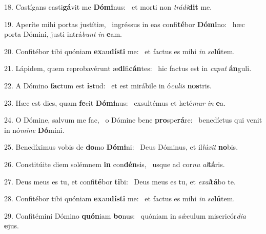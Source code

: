 18. Castígans casti\textbf{gá}vit me \textbf{Dó}\textbf{mi}nus: \ast\  et morti non \textit{trá}\textit{di}\textbf{dit} me.\

19. Aperíte mihi portas justítiæ, \dag\  ingréssus in eas confi\textbf{té}bor \textbf{Dó}\textbf{mi}no: \ast\  hæc porta Dómini, justi intrá\textit{bunt} \textit{in} \textbf{e}am.\

20. Confitébor tibi quóniam \textbf{ex}au\textbf{dís}\textbf{ti} me: \ast\  et factus es mihi \textit{in} \textit{sa}\textbf{lú}tem.\

21. Lápidem, quem reprobavérunt æ\textbf{di}fi\textbf{cán}tes: \ast\  hic factus est in \textit{ca}\textit{put} \textbf{án}guli.\

22. A Dómino \textbf{fac}tum est \textbf{is}tud: \ast\  et est mirábile in ó\textit{cu}\textit{lis} \textbf{nos}tris.\

23. Hæc est dies, quam \textbf{fe}cit \textbf{Dó}\textbf{mi}nus: \ast\  exsultémus et læté\textit{mur} \textit{in} \textbf{e}a.\

24. O Dómine, salvum me fac, \dag\  o Dómine bene \textbf{pro}spe\textbf{rá}re: \ast\  benedíctus qui venit in nó\textit{mi}\textit{ne} \textbf{Dó}mini.\

25. Benedíximus vobis de \textbf{do}mo \textbf{Dó}\textbf{mi}ni: \ast\  Deus Dóminus, et il\textit{lú}\textit{xit} \textbf{no}bis.\

26. Constitúite diem solémnem \textbf{in} con\textbf{dén}sis, \ast\  usque ad cor\textit{nu} \textit{al}\textbf{tá}ris.\

27. Deus meus es tu, et confi\textbf{té}bor \textbf{ti}bi: \ast\  Deus meus es tu, et \textit{ex}\textit{al}\textbf{tá}bo te.\

28. Confitébor tibi quóniam \textbf{ex}au\textbf{dís}\textbf{ti} me: \ast\  et factus es mihi \textit{in} \textit{sa}\textbf{lú}tem.\

29. Confitémini Dómino \textbf{quón}iam \textbf{bo}nus: \ast\  quóniam in sǽculum misericór\textit{di}\textit{a} \textbf{e}jus.\

